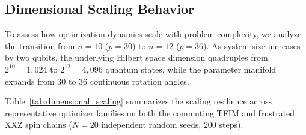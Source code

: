 \documentclass[11pt,a4paper]{article}
\begin{document}
\subsection{Dimensional Scaling Behavior}
\label{sec:scaling_results}
To assess how optimization dynamics scale with problem complexity, we analyze the transition from $n=10$ ($p=30$) to $n=12$ ($p=36$). As system size increases by two qubits, the underlying Hilbert space dimension quadruples from $2^{10} = 1,024$ to $2^{12} = 4,096$ quantum states, while the parameter manifold expands from $30$ to $36$ continuous rotation angles. 

Table~\ref{tab:dimensional_scaling} summarizes the scaling resilience across representative optimizer families on both the commuting TFIM and frustrated XXZ spin chains ($N=20$ independent random seeds, $200$ steps).
\end{document}
